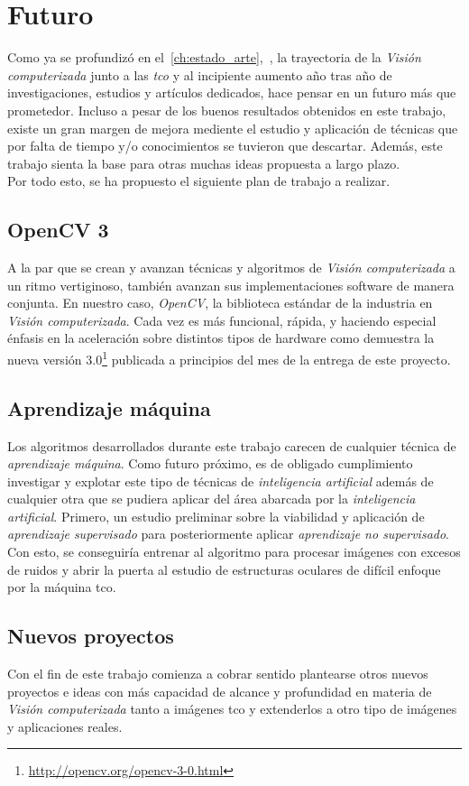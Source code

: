 \chapter{Futuro}
Como ya se profundizó en
el~\autoref{ch:estado_arte},~, la trayectoria
de la \emph{Visión computerizada} junto a las \emph{\gls{tco}} y al
incipiente aumento año tras año de investigaciones, estudios y
artículos dedicados, hace pensar en un futuro más que
prometedor. Incluso a pesar de los buenos resultados obtenidos en este
trabajo, existe un gran margen de mejora mediente el estudio y
aplicación de técnicas que por falta de tiempo y/o conocimientos se
tuvieron que descartar. Además, este trabajo sienta la base para otras
muchas ideas propuesta a largo plazo.\\
Por todo esto, se ha propuesto el siguiente plan de trabajo a
realizar.

\section{OpenCV 3}
A la par que se crean y avanzan técnicas y algoritmos de \emph{Visión
  computerizada} a un ritmo vertiginoso, también avanzan sus
implementaciones software de manera conjunta. En nuestro caso,
\emph{OpenCV}, la biblioteca estándar de la industria en \emph{Visión
  computerizada}. Cada vez es más funcional, rápida, y haciendo
especial énfasis en la aceleración sobre distintos tipos de hardware
como demuestra la nueva versión
$3.0$\footnote{\url{http://opencv.org/opencv-3-0.html}} publicada a
principios del mes de la entrega de este proyecto.

\section{Aprendizaje máquina}
Los algoritmos desarrollados durante este trabajo carecen de cualquier
técnica de \emph{aprendizaje máquina}. Como futuro próximo, es de
obligado cumplimiento investigar y explotar este tipo de técnicas de
\emph{inteligencia artificial} además de cualquier otra que se pudiera
aplicar del área abarcada por la \emph{inteligencia
  artificial}. Primero, un estudio preliminar sobre la viabilidad y
aplicación de \emph{aprendizaje supervisado} para posteriormente
aplicar \emph{aprendizaje no supervisado}. Con esto, se conseguiría
entrenar al algoritmo para procesar imágenes con excesos de ruidos y
abrir la puerta al estudio de estructuras oculares de difícil enfoque
por la máquina \gls{tco}.

\section{Nuevos proyectos}
Con el fin de este trabajo comienza a cobrar sentido plantearse otros
nuevos proyectos e ideas con más capacidad de alcance y profundidad en
materia de \emph{Visión computerizada} tanto a imágenes \gls{tco} y
extenderlos a otro tipo de imágenes y aplicaciones reales.
